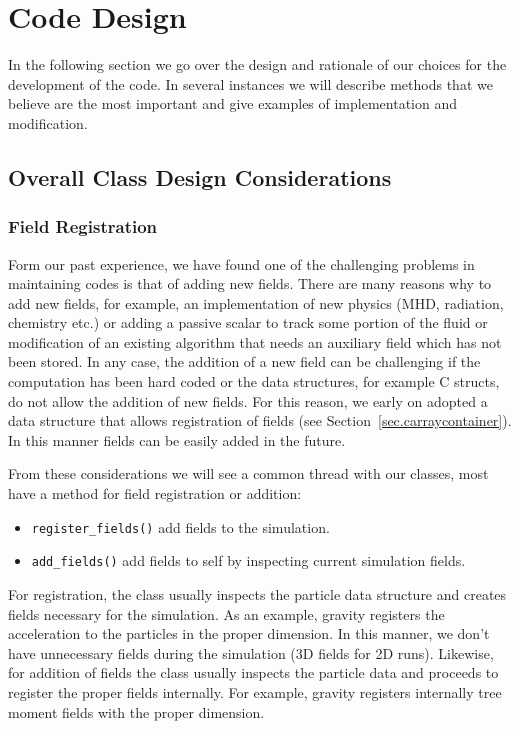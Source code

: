 \section{Code Design}
In the following section we go over the design and rationale of our choices
for the development of the code. In several instances we will describe 
methods that we believe are the most important and give examples of 
implementation and modification.

\subsection{Overall Class Design Considerations}
\subsubsection{Field Registration}
Form our past experience, we have found one of the challenging problems in maintaining codes
is that of adding new fields. There are many reasons why to add new fields, for example,
an implementation of new physics (MHD, radiation, chemistry etc.) or adding a passive scalar
to track some portion of the fluid or modification of an existing algorithm that needs an auxiliary
field which has not been stored. In any case, the addition of a new field can be challenging
if the computation has been hard coded or the data structures, for example C structs, do not
allow the addition of new fields. For this reason, we early on adopted a data structure
that allows registration of fields (see Section~\ref{sec.carraycontainer}). In this manner
fields can be easily added in the future.

From these considerations we will see a common thread with our classes, most have a method
for field registration or addition:
\begin{itemize}
	\item \lstinline{register_fields()} add fields to the simulation.
    \item \lstinline{add_fields()} add fields to self by inspecting current simulation fields.
\end{itemize}
For registration, the class usually inspects the particle data structure and creates fields
necessary for the simulation. As an example, gravity registers the acceleration to the particles
in the proper dimension. In this manner, we don't have unnecessary fields during the simulation
(3D fields for 2D runs). Likewise, for addition of fields the class usually inspects the
particle data and proceeds to register the proper fields internally. For example, gravity 
registers internally tree moment fields with the proper dimension.

